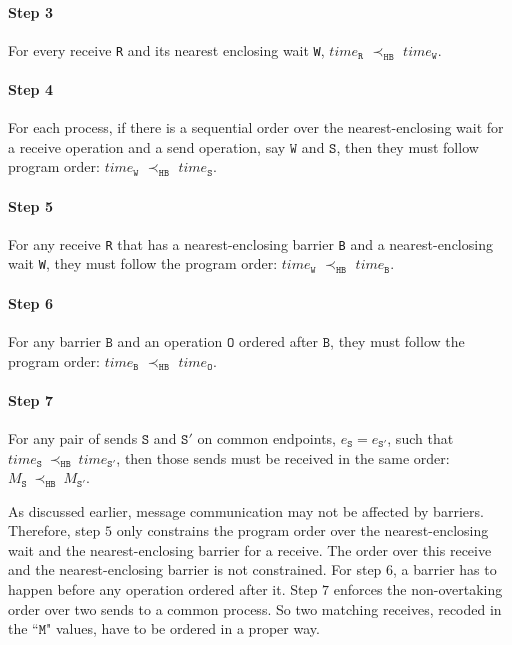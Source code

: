 \paragraph*{Step 3} For every receive \texttt{R} and its nearest
enclosing wait \texttt{W}, $\mathit{time}_\mathtt{R}$
$\prec_\mathtt{HB}$ $\mathit{time}_\mathtt{W}$.

\paragraph*{Step 4} For each process, if there is a sequential order over the nearest-enclosing wait for a receive operation and a send operation, say $\mathtt{W}$ and $\mathtt{S}$, then they must follow program order: $\mathit{time}_\mathtt{W}$
$\prec_\mathtt{HB}$ $\mathit{time}_\mathtt{S}$.

\paragraph*{Step 5} For any receive \texttt{R} that has a nearest-enclosing barrier \texttt{B} and a nearest-enclosing wait \texttt{W}, they must follow the program order:
$\mathit{time}_\mathtt{W}$ $\prec_\mathtt{HB}$ $\mathit{time}_\mathtt{B}$.

\paragraph*{Step 6} For any barrier $\mathtt{B}$ and an operation $\mathtt{O}$ ordered after $\mathtt{B}$, they must follow the program order: $\mathit{time}_\mathtt{B}$
$\prec_\mathtt{HB}$ $\mathit{time}_\mathtt{O}$.

\paragraph*{Step 7} For any pair of sends $\mathtt{S}$ and
$\mathtt{S'}$ on common endpoints, $e_{\mathtt{S}}=e_{\mathtt{S'}}$,
such that
$\mathit{time}_\mathtt{S}\ \mathrm{\prec_\mathtt{HB}}\ \mathit{time}_\mathtt{S'}$,
then those sends must be received in the same order:
$M_{\mathtt{S}}\ \mathrm{\prec_{\mathtt{HB}}}\ M_{\mathtt{S'}}$.

As discussed earlier, message communication may not be affected by barriers. Therefore, step $5$ only constrains the program order over the nearest-enclosing wait and the nearest-enclosing barrier for a receive. The order over this receive and the nearest-enclosing barrier is not constrained. For step $6$, a barrier has to happen before any operation ordered after it. Step $7$ enforces the non-overtaking order over two sends to a common process. So two matching receives, recoded in the ``$\mathtt{M}$" values, have to be ordered in a proper way.

